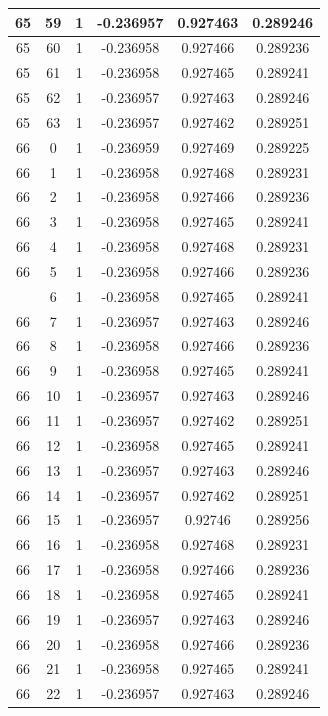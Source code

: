 \documentclass[12pt,a4paper]{article}
\numberwithin{equation}{section}
\numberwithin{figure}{section}
\numberwithin{table}{section}
\begin{document}
\begin{longtable}{|c|c|c|c|c|c|}
65 & 59 & 1 & -0.236957 & 0.927463 & 0.289246 \\ \hline
65 & 60 & 1 & -0.236958 & 0.927466 & 0.289236 \\ \hline
65 & 61 & 1 & -0.236958 & 0.927465 & 0.289241 \\ \hline
65 & 62 & 1 & -0.236957 & 0.927463 & 0.289246 \\ \hline
65 & 63 & 1 & -0.236957 & 0.927462 & 0.289251 \\ \hline
66 & 0 & 1 & -0.236959 & 0.927469 & 0.289225 \\ \hline
66 & 1 & 1 & -0.236958 & 0.927468 & 0.289231 \\ \hline
66 & 2 & 1 & -0.236958 & 0.927466 & 0.289236 \\ \hline
66 & 3 & 1 & -0.236958 & 0.927465 & 0.289241 \\ \hline
66 & 4 & 1 & -0.236958 & 0.927468 & 0.289231 \\ \hline
66 & 5 & 1 & -0.236958 & 0.927466 & 0.289236 \\ \hline
\pagebreak
66 & 6 & 1 & -0.236958 & 0.927465 & 0.289241 \\ \hline
66 & 7 & 1 & -0.236957 & 0.927463 & 0.289246 \\ \hline
66 & 8 & 1 & -0.236958 & 0.927466 & 0.289236 \\ \hline
66 & 9 & 1 & -0.236958 & 0.927465 & 0.289241 \\ \hline
66 & 10 & 1 & -0.236957 & 0.927463 & 0.289246 \\ \hline
66 & 11 & 1 & -0.236957 & 0.927462 & 0.289251 \\ \hline
66 & 12 & 1 & -0.236958 & 0.927465 & 0.289241 \\ \hline
66 & 13 & 1 & -0.236957 & 0.927463 & 0.289246 \\ \hline
66 & 14 & 1 & -0.236957 & 0.927462 & 0.289251 \\ \hline
66 & 15 & 1 & -0.236957 & 0.92746 & 0.289256 \\ \hline
66 & 16 & 1 & -0.236958 & 0.927468 & 0.289231 \\ \hline
66 & 17 & 1 & -0.236958 & 0.927466 & 0.289236 \\ \hline
66 & 18 & 1 & -0.236958 & 0.927465 & 0.289241 \\ \hline
66 & 19 & 1 & -0.236957 & 0.927463 & 0.289246 \\ \hline
66 & 20 & 1 & -0.236958 & 0.927466 & 0.289236 \\ \hline
66 & 21 & 1 & -0.236958 & 0.927465 & 0.289241 \\ \hline
66 & 22 & 1 & -0.236957 & 0.927463 & 0.289246 \\ \hline

\end{longtable}
\end{document}
